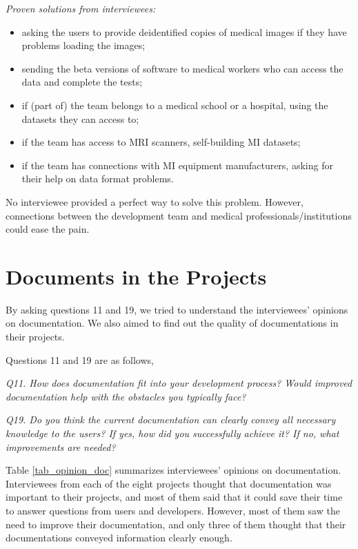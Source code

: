 \textit{Proven solutions from interviewees:}
\begin{itemize}
\item asking the users to provide deidentified copies of medical images if they have problems loading the images;
\item sending the beta versions of software to medical workers who can access the data and complete the tests;
\item if (part of) the team belongs to a medical school or a hospital, using the datasets they can access to;
\item if the team has access to MRI scanners, self-building MI datasets;
\item if the team has connections with MI equipment manufacturers, asking for their help on data format problems.
\end{itemize}

No interviewee provided a perfect way to solve this problem. However, connections between the development team and medical professionals/institutions could ease the pain.

\section{Documents in the Projects}
By asking questions 11 and 19, we tried to understand the interviewees' opinions on documentation. We also aimed to find out the quality of documentations in their projects.

Questions 11 and 19 are as follows,

\textit{Q11. How does documentation fit into your development process? Would improved documentation help with the obstacles you typically face?}

\textit{Q19. Do you think the current documentation can clearly convey all necessary knowledge to the users? If yes, how did you successfully achieve it? If no, what improvements are needed?}

Table \ref{tab_opinion_doc} summarizes interviewees' opinions on documentation. Interviewees from each of the eight projects thought that documentation was important to their projects, and most of them said that it could save their time to answer questions from users and developers. However, most of them saw the need to improve their documentation, and only three of them thought that their documentations conveyed information clearly enough. 


